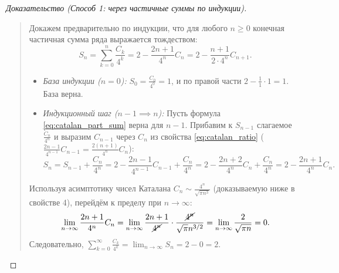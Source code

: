 \begin{proof}[Доказательство (Способ 1: через частичные суммы по индукции)]~\\
    \begin{quote}
        Докажем предварительно по индукции, что для любого $n \ge 0$ 
        конечная частичная сумма ряда выражается тождеством:
        \begin{equation} \label{eq:catalan_part_sum}
            S_n = \sum_{k=0}^{n} \frac{C_k}{4^k} = 
            2 - \frac{2n + 1}{4^n} C_n = 2 - \frac{n + 1}{2 \cdot 4^n} C_{n+1}. 
            \tag{7}
        \end{equation}
        \begin{itemize}
            \item \emph{База индукции ($n = 0$):} 
            $S_0 = \frac{C_0}{4^0} = 1$, и по правой части 
            $2 - \frac{1}{1} \cdot 1 = 1$. База верна.
            \item \emph{Индукционный шаг ($n - 1 \implies n$):} 
            Пусть формула \eqref{eq:catalan_part_sum} верна для $n - 1$. 
            Прибавим к $S_{n-1}$ слагаемое $\frac{C_n}{4^n}$ и выразим 
            $C_{n-1}$ через $C_n$ из свойства \eqref{eq:catalan_ratio} 
            ($\frac{2n - 1}{4^{n-1}} C_{n-1} = \frac{2(n + 1)}{4^n} C_n$):
            \[
                S_n = S_{n-1} + \frac{C_n}{4^n} = 
                2 - \frac{2n - 1}{4^{n-1}} C_{n-1} + \frac{C_n}{4^n} = 
                2 - \frac{2n + 2}{4^n} C_n + \frac{C_n}{4^n} = 
                2 - \frac{2n + 1}{4^n} C_n.
            \]
        \end{itemize}
        Используя асимптотику чисел Каталана $C_n \sim \frac{4^n}{\sqrt{\pi n^3}}$ 
        (доказываемую ниже в свойстве 4), перейдём к пределу при $n \to \infty$:
        \[
            \lim_{n \to \infty} \frac{2n + 1}{4^n} C_n = 
            \lim_{n \to \infty} \frac{2n + 1}{\cancel{4^n}} \cdot 
            \frac{\cancel{4^n}}{\sqrt{\pi} n^{3/2}} = 
            \lim_{n \to \infty} \frac{2}{\sqrt{\pi n}} = 0.
        \]
        Следовательно, $\sum_{k=0}^\infty \frac{C_k}{4^k} = 
        \lim_{n \to \infty} S_n = 2 - 0 = 2$.
    \end{quote}
\end{proof}


